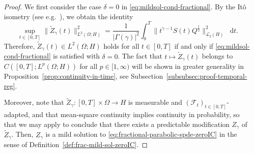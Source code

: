 \documentclass[reqno]{amsart}
\numberwithin{equation}{section}
\newcommand{\cF}{\mathcal{F}}
\newcommand{\rd}{\mathop{}\!\mathrm{d}}
\newcommand{\from}{\colon}
\theoremstyle{remark}
\theoremstyle{definition}
\begin{document}
\begin{proof} 
	We first consider the case $\delta=0$ 
	in \eqref{eq:mildsol-cond-fractional}.
	By the It\^o isometry 
	(see e.g.\ \cite[Proposition 2.3.5 and p.~32]{LiuRockner2015}), 
	we obtain the identity  
	\[
	\sup_{t\in[0,T]} 
	\| \widetilde{Z}_\gamma(t) \|_{L^2(\Omega;H)}^2
	=  
	\frac{1}{|\Gamma(\gamma)|^2}
	\int_0^T 
	\bigl\| t^{\gamma-1} S(t) Q^{ \frac{1}{2} } \bigr\|_{\mathscr L_2(H)}^2 
	\rd t . 
	\]
	Therefore, 
	$\widetilde{Z}_\gamma(t)\in L^2(\Omega;H)$  
	holds 
	for all $t\in[0,T]$  
	if and only if \eqref{eq:mildsol-cond-fractional} 
	is satisfied with $\delta=0$. 
	The fact  
	that $t\mapsto \widetilde{Z}_\gamma(t)$ 
	belongs to $C([0,T];L^p(\Omega;H))$ 
	for all $p\in[1,\infty)$ 
	will be shown in greater generality 
	in Proposition~\ref{prop:continuity-in-time}, 
	see Subsection~\ref{subsubsec:proof-temporal-reg}.  
	
	Moreover, note that 
	$\widetilde{Z}_\gamma \from [0,T]\times\Omega \to H$  
	is measurable and 
	$(\cF_t)_{t\in[0,T]}$-adapted, 
	and that mean-square continuity implies 
	continuity in probability, so that 
	we may apply 
	\cite[Proposition~3.21]{Peszat_zabczyk_2007} 
	to conclude that 
	there exists a 
	predictable modification $Z_\gamma$ 
	of $\widetilde{Z}_\gamma$. 
	Then, $Z_\gamma$ is    
	a mild solution to \eqref{eq:fractional-parabolic-spde-zeroIC} 
	in the sense of Definition~\ref{def:frac-mild-sol-zeroIC}. 
	

\end{proof}
\end{document}
